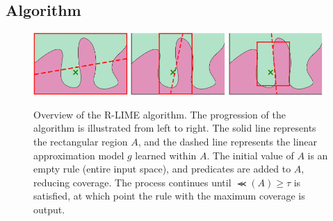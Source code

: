 \documentclass[runningheads]{llncs}
\begin{document}
{\subsection{Algorithm}
{%
  \begin{figure}[t]
    \centering
    \includegraphics[width=0.32\textwidth]{visual-rlime1}
    \includegraphics[width=0.32\textwidth]{visual-rlime2}
    \includegraphics[width=0.32\textwidth]{visual-rlime3}
    \caption[Overview of the R-LIME algorithm]{%
      Overview of the R-LIME algorithm.
      The progression of the algorithm is illustrated from left to right.
      The solid line represents the rectangular region $A$,
      and the dashed line represents the linear approximation model $g$
      learned within $A$.
      The initial value of $A$ is an empty rule (entire input space),
      and predicates are added to $A$, reducing coverage.
      The process continues until $\Prec(A)\ge\tau$ is satisfied,
      at which point the rule with the maximum coverage is output.
    }
  \end{figure}
  \def\myidt{\hspace{\algorithmicindent}}
  \begin{algorithm}[p]
    \small
    
  \end{algorithm}

  \begin{algorithm}[p]
    \small
    
  \end{algorithm}

  \begin{algorithm}[p]
    \small
    
  \end{algorithm}

}}
\end{document}
